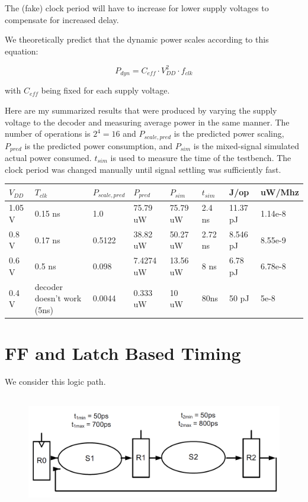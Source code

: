 \documentclass[11pt]{article}
\begin{document}
The (fake) clock period will have to increase for lower supply voltages to compensate for increased delay.

We theoretically predict that the dynamic power scales according to this equation:

\begin{equation}
	P_{dyn} = C_{eff} \cdot V_{DD}^2 \cdot f_{clk}
\end{equation}

with $C_{eff}$ being fixed for each supply voltage. 

Here are my summarized results that were produced by varying the supply voltage to the decoder and measuring average power in the same manner. The number of operations is $2^4 = 16$ and $P_{scale,pred}$ is the predicted power scaling, $P_{pred}$ is the predicted power consumption, and $P_{sim}$ is the mixed-signal simulated actual power consumed. $t_{sim}$ is used to measure the time of the testbench. The clock period was changed manually until signal settling was sufficiently fast.

\begin{center}
\begin{tabular}{| l | l | l | l | l | l | l | l |} \hline
	$V_{DD}$ & $T_{clk}$ & $P_{scale,pred}$ & $P_{pred}$ & $P_{sim}$ & $t_{sim}$ & J/op & uW/Mhz \\ \hline
	1.05 V & 0.15 ns & 1.0 & 75.79 uW & 75.79 uW & 2.4 ns & 11.37 pJ & 1.14e-8 \\ \hline
	0.8 V & 0.17 ns & 0.5122 & 38.82 uW & 50.27 uW & 2.72 ns & 8.546 pJ & 8.55e-9\\ \hline
	0.6 V & 0.5 ns & 0.098 & 7.4274 uW & 13.56 uW & 8 ns & 6.78 pJ & 6.78e-8 \\ \hline
	0.4 V & decoder doesn't work (5ns) & 0.0044 & 0.333 uW & 10 uW & 80ns & 50 pJ &  5e-8 \\ \hline
\end{tabular}
\end{center}

\section{FF and Latch Based Timing}
We consider this logic path.

\begin{figure}[H]
	\centerline{\includegraphics[height=5cm]{images/logic_path.png}}
\end{figure}
\end{document}
